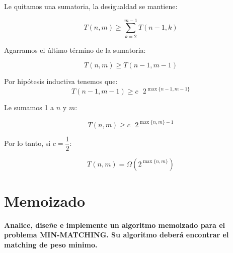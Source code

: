 \documentclass[12pt,a4,paper]{article}
\begin{document}
Le quitamos una sumatoria, la desigualdad se mantiene:

\begin{equation*}
    T(n,m) \geq \sum_{k = 2}^{m-1} {T(n-1, k)}
\end{equation*}

Agarramos el último término de la sumatoria:

\begin{equation*}
    T(n,m) \geq T(n-1,m-1)
\end{equation*}

Por hip\'otesis inductiva tenemos que:
\begin{equation*}
   T(n-1,m-1) \geq c\text{ }2^{\max\{n-1,m-1\}}
\end{equation*}

Le sumamos 1 a $n$ y $m$:

\begin{equation*}
    T(n, m) \geq c\text{ }2^{\max\{n,m\}-1}
\end{equation*}

Por lo tanto, si $c = \dfrac{1}{2}$:

\begin{equation*}
    T(n, m) = \Omega(2^{\max\{n,m\}})
\end{equation*}

\newpage

\section{Memoizado}

\textbf{Analice, diseñe e implemente un algoritmo memoizado para el problema \textsc{MIN-MATCHING}. Su algoritmo deberá encontrar el matching de peso minimo.}\\
\end{document}
